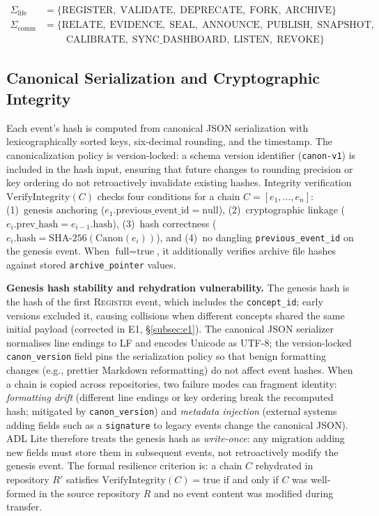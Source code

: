 \begin{align}
    \Sigma_{\text{life}} &= \{\text{REGISTER},\; \text{VALIDATE},\; \text{DEPRECATE},\; \text{FORK},\; \text{ARCHIVE}\} \\
    \Sigma_{\text{comm}} &= \{\text{RELATE},\; \text{EVIDENCE},\; \text{SEAL},\; \text{ANNOUNCE},\; \text{PUBLISH},\; \text{SNAPSHOT}, \nonumber \\
    &\qquad\; \text{CALIBRATE},\; \text{SYNC\_DASHBOARD},\; \text{LISTEN},\; \text{REVOKE}\}
\end{align}

\subsection{Canonical Serialization and Cryptographic Integrity}\label{subsec:crypto}

Each event's hash is computed from canonical JSON serialization with lexicographically sorted keys, six-decimal rounding, and the timestamp. The canonicalization policy is version-locked: a schema version identifier (\texttt{canon-v1}) is included in the hash input, ensuring that future changes to rounding precision or key ordering do not retroactively invalidate existing hashes. Integrity verification $\text{VerifyIntegrity}(C)$ checks four conditions for a chain $C = [e_1, \ldots, e_n]$: (1)~genesis anchoring ($e_1.\text{previous\_event\_id} = \text{null}$), (2)~cryptographic linkage ($e_i.\text{prev\_hash} = e_{i-1}.\text{hash}$), (3)~hash correctness ($e_i.\text{hash} = \text{SHA-256}(\text{Canon}(e_i))$), and (4)~no dangling \texttt{previous\_event\_id} on the genesis event. When $\text{full}=\text{true}$, it additionally verifies archive file hashes against stored \texttt{archive\_pointer} values.\par
\textbf{Genesis hash stability and rehydration vulnerability.} The genesis hash is the hash of the first \textsc{Register} event, which includes the \texttt{concept\_id}; early versions excluded it, causing collisions when different concepts shared the same initial payload (corrected in E1, \S\ref{subsec:e1}). The canonical JSON serializer normalises line endings to LF and encodes Unicode as UTF-8; the version-locked \texttt{canon\_version} field pins the serialization policy so that benign formatting changes (e.g., prettier Markdown reformatting) do not affect event hashes. When a chain is copied across repositories, two failure modes can fragment identity: \emph{formatting drift} (different line endings or key ordering break the recomputed hash; mitigated by \texttt{canon\_version}) and \emph{metadata injection} (external systems adding fields such as a \texttt{signature} to legacy events change the canonical JSON). ADL Lite therefore treats the genesis hash as \emph{write-once}: any migration adding new fields must store them in subsequent events, not retroactively modify the genesis event. The formal resilience criterion is: a chain $C$ rehydrated in repository $R'$ satisfies $\text{VerifyIntegrity}(C) = \text{true}$ if and only if $C$ was well-formed in the source repository $R$ and no event content was modified during transfer.

